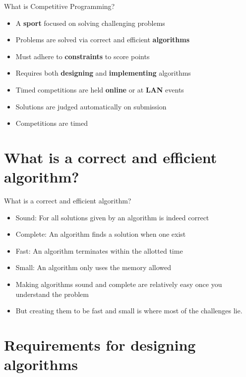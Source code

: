 \documentclass{beamer}
\begin{document}
\begin{frame}{What is Competitive Programming?}
    \begin{itemize}
        \item A \textbf{sport} focused on solving challenging problems
        \pause
        \item Problems are solved via correct and efficient \textbf{algorithms}
        \pause
        \item Must adhere to \textbf{constraints} to score points
        \pause
        \item Requires both \textbf{designing} and \textbf{implementing} algorithms
        \pause
        \item Timed competitions are held \textbf{online} or at \textbf{LAN} events
        \pause
        \item Solutions are judged automatically on submission
        \pause
        \item Competitions are timed
    \end{itemize}
\end{frame}

\section{What is a correct and efficient algorithm?}

\begin{frame}{What is a correct and efficient algorithm?}
    \begin{itemize}
        \item Sound: For all solutions given by an algorithm is indeed correct
        \pause
        \item Complete: An algorithm finds a solution when one exist
        \pause
        \item Fast: An algorithm terminates within the allotted time
        \pause
        \item Small: An algorithm only uses the memory allowed
        \pause
        \item Making algorithms sound and complete are relatively easy once you understand the problem
        \pause
        \item But creating them to be fast and small is where most of the challenges lie.
    \end{itemize}
\end{frame}

\section{Requirements for designing algorithms}
\end{document}
